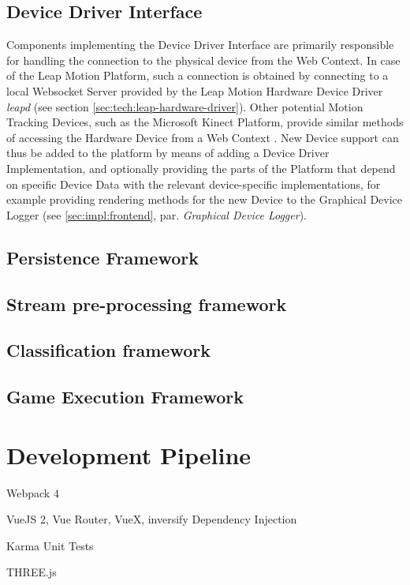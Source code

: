 \subsection{Device Driver Interface}
\label{sec:impl:driver}
Components implementing the Device Driver Interface are primarily responsible for handling the connection to the physical device from the Web Context. In case of the Leap Motion Platform, such a connection is obtained by connecting to a local Websocket Server provided by the Leap Motion Hardware Device Driver \emph{leapd} (see section \ref{sec:tech:leap-hardware-driver}). Other potential Motion Tracking Devices, such as the Microsoft Kinect Platform, provide similar methods of accessing the Hardware Device from a Web Context \cite{KinectSDK}. New Device support can thus be added to the platform by means of adding a Device Driver Implementation, and optionally providing the parts of the Platform that depend on specific Device Data with the relevant device-specific implementations, for example providing rendering methods for the new Device to the Graphical Device Logger (see \ref{sec:impl:frontend}, par. \emph{Graphical Device Logger}).

\subsection{Persistence Framework}
\label{sec:impl:persist}
\subsection{Stream pre-processing framework}
\label{sec:impl:preprocessing}
\subsection{Classification framework}
\label{sec:impl:classify}
\subsection{Game Execution Framework}
\label{sec:impl:gameexec}




\section{Development Pipeline}
Webpack 4

VueJS 2, Vue Router, VueX, inversify Dependency Injection

Karma Unit Tests

THREE.js
